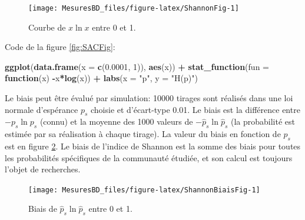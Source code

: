 \documentclass[
  11pt,
  french,
  a4paper,
  extrafontsizes,onecolumn,openright
  ]{memoir}
\newenvironment{Shaded}{\begin{snugshade}}{\end{snugshade}}
\newcommand{\ControlFlowTok}[1]{\textcolor[rgb]{0.13,0.29,0.53}{\textbf{#1}}}
\newcommand{\DataTypeTok}[1]{\textcolor[rgb]{0.13,0.29,0.53}{#1}}
\newcommand{\DecValTok}[1]{\textcolor[rgb]{0.00,0.00,0.81}{#1}}
\newcommand{\FloatTok}[1]{\textcolor[rgb]{0.00,0.00,0.81}{#1}}
\newcommand{\KeywordTok}[1]{\textcolor[rgb]{0.13,0.29,0.53}{\textbf{#1}}}
\newcommand{\NormalTok}[1]{#1}
\newcommand{\OperatorTok}[1]{\textcolor[rgb]{0.81,0.36,0.00}{\textbf{#1}}}
\newcommand{\StringTok}[1]{\textcolor[rgb]{0.31,0.60,0.02}{#1}}
\begin{document}
\scriptsize

\begin{figure}

{\centering \texttt{[image: MesuresBD\_files/figure-latex/ShannonFig-1]} 

}

\caption{Courbe de \(x\ln x\) entre 0 et 1.}\label{fig:ShannonFig}
\end{figure}

\normalsize

Code de la figure \ref{fig:SACFig}:

\scriptsize

\begin{Shaded}
\begin{Highlighting}[]
\KeywordTok{ggplot}\NormalTok{(}\KeywordTok{data.frame}\NormalTok{(}\DataTypeTok{x =} \KeywordTok{c}\NormalTok{(}\FloatTok{0.0001}\NormalTok{, }\DecValTok{1}\NormalTok{)), }\KeywordTok{aes}\NormalTok{(x)) }\OperatorTok{+}\StringTok{ }
\StringTok{    }\KeywordTok{stat_function}\NormalTok{(}\DataTypeTok{fun =} \ControlFlowTok{function}\NormalTok{(x) }\OperatorTok{-}\NormalTok{x}\OperatorTok{*}\KeywordTok{log}\NormalTok{(x)) }\OperatorTok{+}
\StringTok{    }\KeywordTok{labs}\NormalTok{(}\DataTypeTok{x =} \StringTok{"p"}\NormalTok{, }\DataTypeTok{y =} \StringTok{"H(p)"}\NormalTok{)}
\end{Highlighting}
\end{Shaded}

\normalsize

Le biais peut être évalué par simulation: 10000 tirages sont réalisés dans une loi normale d'espérance \(p_s\) choisie et d'écart-type 0.01.
Le biais est la différence entre \({-p}_s{\ln p_s}\) (connu) et la moyenne des 1000 valeurs de \(-\hat{p}_s{\ln{\hat{p}}_s}\) (la probabilité est estimée par sa réalisation à chaque tirage).
La valeur du biais en fonction de \(p_s\) est en figure \ref{fig:ShannonBiaisFig}.
Le biais de l'indice de Shannon est la somme des biais pour toutes les probabilités spécifiques de la communauté étudiée, et son calcul est toujours l'objet de recherches.



\scriptsize

\begin{figure}

{\centering \texttt{[image: MesuresBD\_files/figure-latex/ShannonBiaisFig-1]} 

}

\caption{Biais de \(\hat{p}_s \ln\hat{p}_s\) entre 0 et 1.}\label{fig:ShannonBiaisFig}
\end{figure}
\end{document}
